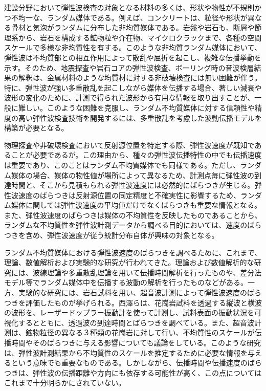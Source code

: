﻿%
建設分野において弾性波検査の対象となる材料の多くは、形状や物性が不規則かつ不均一な、ランダム媒体である。例えば、コンクリートは、粒径や形状が異なる骨材と気泡がランダムに分布した非均質媒体である。岩盤や岩石も、断層や節理系から、岩石を構成する鉱物粒や介在物、マイクロクラックまで、各種の空間スケールで多様な非均質性を有する。このような非均質ランダム媒体において、弾性波は不均質部との相互作用によって散乱や屈折を起こし、複雑な伝播挙動を示す。そのため、地震探査や岩石コアの弾性波検査、ボーリング時の音波検層結果の解釈は、金属材料のような均質材に対する非破壊検査には無い困難が伴う。特に、弾性波が強い多重散乱を起こしながら媒体を伝播する場合、著しい減衰や波形の変化のために、計測で得られた波形から有用な情報を取り出すことが、一般に難しい。このような困難を克服し、ランダム不均質媒体に対する信頼性や精度の高い弾性波検査技術を開発するには、多重散乱を考慮した波動伝播モデルを構築が必要となる。

物理探査や非破壊検査において反射源位置を特定する際、弾性波速度が既知であることが必要であるが。この理由から、種々の弾性波伝播特性の中でも伝播速度は重要であり、このことはランダム不均質媒体でも同様である。ただし、ランダム媒体の場合、媒体の物性値が場所によって異なるため、計測点毎に弾性波の到達時間と、そこから見積もられる弾性波速度には必然的にばらつきが生じる。弾性波速度のばらつきは反射源位置の同定精度と不確実性に影響するため、ランダム媒体に関しては弾性波速度の平均値だけでなくばらつきも重要な情報となる。また、弾性波速度のばらつきは媒体の不均質性を反映したものであることから、ランダムな不均質性を弾性波計測データから調べる目的においては、速度のばらつきを含め、弾性波速度が従う統計分布自体が興味の対象となる。

ランダム不均質媒体における弾性波速度のばらつきを調べるために、これまで、理論、数値解析および実験的な研究が行われてきた。理論および数値解析的な研究には、波線理論や多重散乱理論を用いて伝播時間解析を行ったものや、差分法モデル等でランダム媒体中を伝播する波動の解析を行ったものなどがある。一方、実験的な研究には、岩石試料を用い、超音波計測によって弾性波速度のばらつきを評価したものが挙げられる。西澤らは、花崗岩試料を透過する縦波と横波の波形を、レーザードップラー振動計を使って計測し、試料表面の振動状況を可視化するとともに、透過波の到達時間とばらつきを調べている。また、超音波計測は、鉱物粒径の異なる３種類の花崗岩に対して行い、不均質性のスケールが伝播時間やそのばらつきに与える影響についても議論をしている。このような研究は、弾性波計測結果から不均質性のスケールを推定するために必要な情報を与えるという意味でも重要なものである。しかしながら、伝播時間や伝播速度のばらつきは、弾性波の伝播距離や方向にも依存する可能性が高く、この点についてはこれまで十分明らかにされていない。

